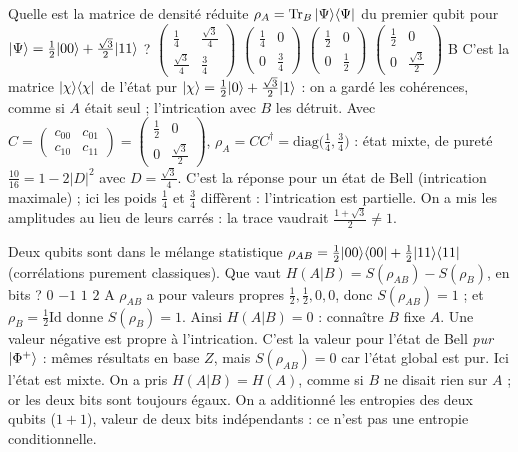   {Quelle est la matrice de densité réduite $\rho_A=\operatorname{Tr}_B|\Psi\rangle\langle \Psi|$ du premier qubit pour $|\Psi\rangle=\frac12|00\rangle+\frac{\sqrt3}{2}|11\rangle$ ?}
  {$\begin{pmatrix}\frac14&\frac{\sqrt3}{4}\\\frac{\sqrt3}{4}&\frac34\end{pmatrix}$}
  {$\begin{pmatrix}\frac14&0\\0&\frac34\end{pmatrix}$}
  {$\begin{pmatrix}\frac12&0\\0&\frac12\end{pmatrix}$}
  {$\begin{pmatrix}\frac12&0\\0&\frac{\sqrt3}{2}\end{pmatrix}$}
  {B}
\qcmx
  {C'est la matrice $|\chi\rangle\langle \chi|$ de l'état pur $|\chi\rangle=\frac12|0\rangle+\frac{\sqrt3}2|1\rangle$ : on a gardé les cohérences, comme si $A$ était seul ; l'intrication avec $B$ les détruit.}
  {Avec $C=\begin{pmatrix}c_{00}&c_{01}\\c_{10}&c_{11}\end{pmatrix}=\begin{pmatrix}\frac12&0\\0&\frac{\sqrt3}2\end{pmatrix}$, $\rho_A=CC^\dagger=\mathrm{diag}\big(\frac14,\frac34\big)$ : état mixte, de pureté $\frac{10}{16}=1-2|D|^2$ avec $D=\frac{\sqrt3}{4}$.}
  {C'est la réponse pour un état de Bell (intrication maximale) ; ici les poids $\frac14$ et $\frac34$ diffèrent : l'intrication est partielle.}
  {On a mis les amplitudes au lieu de leurs carrés : la trace vaudrait $\frac{1+\sqrt3}{2}\neq1$.}

  {Deux qubits sont dans le mélange statistique $\rho_{AB}=\frac12|00\rangle\langle 00|+\frac12|11\rangle\langle 11|$ (corrélations purement classiques). Que vaut $H(A|B)=S(\rho_{AB})-S(\rho_B)$, en bits ?}
  {$0$}
  {$-1$}
  {$1$}
  {$2$}
  {A}
\qcmx
  {$\rho_{AB}$ a pour valeurs propres $\frac12,\frac12,0,0$, donc $S(\rho_{AB})=1$ ; et $\rho_B=\frac12\mathrm{Id}$ donne $S(\rho_B)=1$. Ainsi $H(A|B)=0$ : connaître $B$ fixe $A$. Une valeur négative est propre à l'intrication.}
  {C'est la valeur pour l'état de Bell \emph{pur} $|\Phi^+\rangle$ : mêmes résultats en base $Z$, mais $S(\rho_{AB})=0$ car l'état global est pur. Ici l'état est mixte.}
  {On a pris $H(A|B)=H(A)$, comme si $B$ ne disait rien sur $A$ ; or les deux bits sont toujours égaux.}
  {On a additionné les entropies des deux qubits ($1+1$), valeur de deux bits indépendants : ce n'est pas une entropie conditionnelle.}

